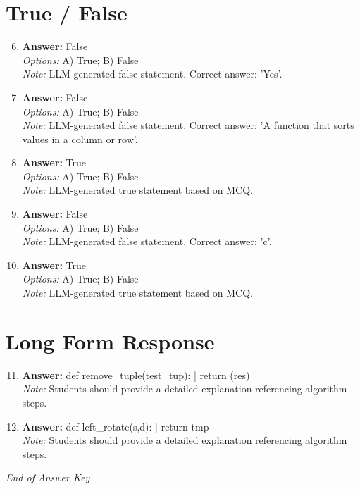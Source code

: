 \documentclass[12pt]{article}
\begin{document}
\section*{True / False}
\begin{enumerate}[label=\arabic*.]
\setcounter{enumi}{5}
\item \textbf{Answer:} False
\\ \textit{Options:} A) True; B) False
\\ \textit{Note:} LLM-generated false statement. Correct answer: 'Yes'.
\item \textbf{Answer:} False
\\ \textit{Options:} A) True; B) False
\\ \textit{Note:} LLM-generated false statement. Correct answer: 'A function that sorts values in a column or row'.
\item \textbf{Answer:} True
\\ \textit{Options:} A) True; B) False
\\ \textit{Note:} LLM-generated true statement based on MCQ.
\item \textbf{Answer:} False
\\ \textit{Options:} A) True; B) False
\\ \textit{Note:} LLM-generated false statement. Correct answer: 'c'.
\item \textbf{Answer:} True
\\ \textit{Options:} A) True; B) False
\\ \textit{Note:} LLM-generated true statement based on MCQ.
\end{enumerate}

\section*{Long Form Response}
\begin{enumerate}[label=\arabic*.]
\setcounter{enumi}{10}
\item \textbf{Answer:} def remove\_tuple(test\_tup): | return (res)
\\ \textit{Note:} Students should provide a detailed explanation referencing algorithm steps.
\item \textbf{Answer:} def left\_rotate(s,d): | return tmp
\\ \textit{Note:} Students should provide a detailed explanation referencing algorithm steps.
\end{enumerate}

\vfill
\noindent\textit{End of Answer Key}
\end{document}
